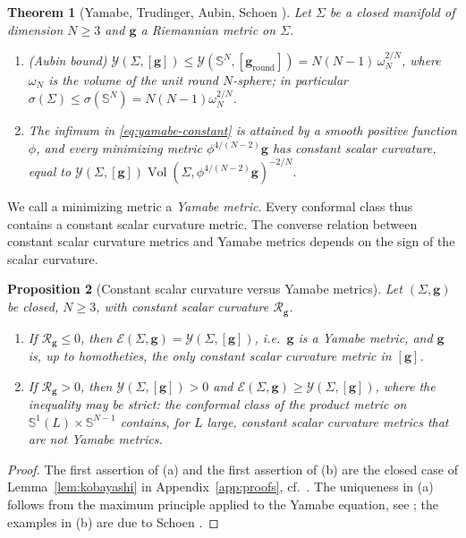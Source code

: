 \documentclass[aps,prd,reprint,amsmath,amssymb,nofootinbib,longbibliography]{revtex4-2}
\DeclareMathOperator{\Vol}{Vol}
\newcommand{\Sph}{\mathbb{S}}
\newcommand{\g}{\mathbf{g}}                 %
\newcommand{\Rs}{\mathcal{R}}               %
\newcommand{\EH}{\mathcal{E}}               %
\newcommand{\Y}{\mathcal{Y}}                %
\theoremstyle{plain}
\newtheorem{theorem}{Theorem}
\newtheorem{proposition}[theorem]{Proposition}
\theoremstyle{definition}
\theoremstyle{remark}
\begin{document}
\begin{theorem}[Yamabe, Trudinger, Aubin, Schoen \cite{MR125546,MR240748,MR448404,Aubin1976JMPA,MR788292}]
\label{thm:yamabe}
Let $\Sigma$ be a closed manifold of dimension $N\ge 3$ and $\g$ a Riemannian metric on $\Sigma$.
\begin{enumerate}
\item[(a)] (Aubin bound) $\Y(\Sigma,[\g])\le \Y(\Sph^N,[\g_{\mathrm{round}}]) = N(N-1)\,\omega_N^{2/N}$, where $\omega_N$ is the volume of the unit round $N$-sphere; in particular $\sigma(\Sigma)\le\sigma(\Sph^N)=N(N-1)\omega_N^{2/N}$.
\item[(b)] The infimum in \eqref{eq:yamabe-constant} is attained by a smooth positive function $\phi$, and every minimizing metric $\phi^{4/(N-2)}\g$ has constant scalar curvature, equal to $\Y(\Sigma,[\g])\Vol(\Sigma,\phi^{4/(N-2)}\g)^{-2/N}$.
\end{enumerate}
\end{theorem}

We call a minimizing metric a \emph{Yamabe metric}. Every conformal class thus contains a constant scalar curvature metric. The converse relation between constant scalar curvature metrics and Yamabe metrics depends on the sign of the scalar curvature.

\begin{proposition}[Constant scalar curvature versus Yamabe metrics]
\label{prop:csc-yamabe}
Let $(\Sigma,\g)$ be closed, $N\ge3$, with constant scalar curvature $\Rs_\g$.
\begin{enumerate}
\item[(a)] If $\Rs_\g\le 0$, then $\EH(\Sigma,\g)=\Y(\Sigma,[\g])$, i.e.\ $\g$ is a Yamabe metric, and $\g$ is, up to homotheties, the only constant scalar curvature metric in $[\g]$.
\item[(b)] If $\Rs_\g>0$, then $\Y(\Sigma,[\g])>0$ and $\EH(\Sigma,\g)\ge\Y(\Sigma,[\g])$, where the inequality may be strict: the conformal class of the product metric on $\Sph^1(L)\times\Sph^{N-1}$ contains, for $L$ large, constant scalar curvature metrics that are not Yamabe metrics.
\end{enumerate}
\end{proposition}
\begin{proof}
The first assertion of (a) and the first assertion of (b) are the closed case of Lemma~\ref{lem:kobayashi} in Appendix~\ref{app:proofs}, cf.\ \cite[Lemma~1.6]{MR919505}. The uniqueness in (a) follows from the maximum principle applied to the Yamabe equation, see \cite{LeeParker1987,Schoen1989}; the examples in (b) are due to Schoen \cite{Schoen1989}.
\end{proof}
\end{document}
